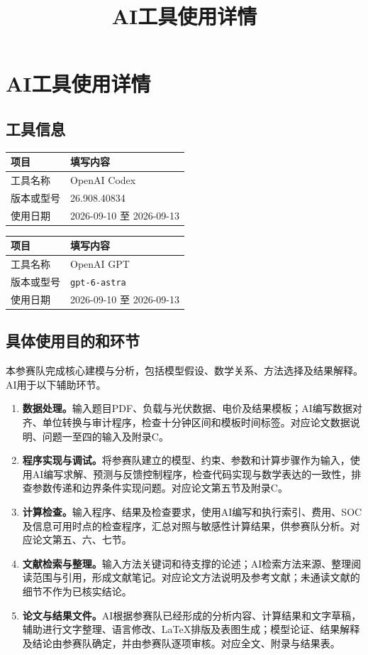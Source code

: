 \documentclass[withoutpreface,bwprint]{cumcmthesis}
\title{AI工具使用详情}
\begin{document}
\section*{AI工具使用详情}
\subsection*{工具信息}
\noindent\begin{tabularx}{\textwidth}{@{}XX@{}}
\toprule 项目 & 填写内容 \\ \midrule
工具名称 & OpenAI Codex \\
版本或型号 & 26.908.40834 \\
使用日期 & 2026-09-10 至 2026-09-13 \\
\bottomrule
\end{tabularx}
\par\medskip
\noindent\begin{tabularx}{\textwidth}{@{}XX@{}}
\toprule 项目 & 填写内容 \\ \midrule
工具名称 & OpenAI GPT \\
版本或型号 & \texttt{gpt-6-astra} \\
使用日期 & 2026-09-10 至 2026-09-13 \\
\bottomrule
\end{tabularx}

\subsection*{具体使用目的和环节}
本参赛队完成核心建模与分析，包括模型假设、数学关系、方法选择及结果解释。AI用于以下辅助环节。
\begin{enumerate}[label=\arabic*)]
\item \textbf{数据处理。}输入题目PDF、负载与光伏数据、电价及结果模板；AI编写数据对齐、单位转换与审计程序，检查十分钟区间和模板时间标签。对应论文数据说明、问题一至四的输入及附录C。
\item \textbf{程序实现与调试。}将参赛队建立的模型、约束、参数和计算步骤作为输入，使用AI编写求解、预测与反馈控制程序，检查代码实现与数学表达的一致性，排查参数传递和边界条件实现问题。对应论文第五节及附录C。
\item \textbf{计算检查。}输入程序、结果及检查要求，使用AI编写和执行索引、费用、SOC及信息可用时点的检查程序，汇总对照与敏感性计算结果，供参赛队分析。对应论文第五、六、七节。
\item \textbf{文献检索与整理。}输入方法关键词和待支撑的论述；AI检索方法来源、整理阅读范围与引用，形成文献笔记。对应论文方法说明及参考文献；未通读文献的细节不作为已核实结论。
\item \textbf{论文与结果文件。}AI根据参赛队已经形成的分析内容、计算结果和文字草稿，辅助进行文字整理、语言修改、LaTeX排版及表图生成；模型论证、结果解释及结论由参赛队确定，并由参赛队逐项审核。对应全文、附录与结果表。
\end{enumerate}
\end{document}
